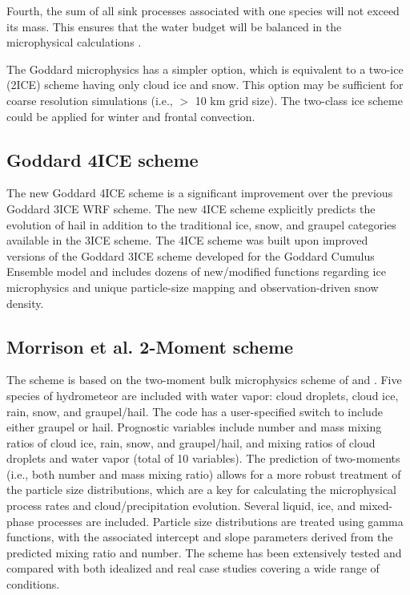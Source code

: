 Fourth, the sum of all sink processes associated with one species will not exceed its mass.  This ensures that the water budget will be balanced in the microphysical calculations .

The Goddard microphysics has a simpler option, which is equivalent to a two-ice (2ICE) scheme having only cloud ice and snow.  This option may be sufficient for coarse resolution simulations (i.e., $>$ 10 km grid size).  The two-class ice scheme could be applied for winter and frontal convection.

\subsection {Goddard 4ICE  scheme}

The new Goddard 4ICE scheme \citep{lang14, tao16} is a significant improvement over the previous Goddard 3ICE WRF scheme.  The new 4ICE scheme explicitly predicts the evolution of hail in addition to the traditional ice, snow, and graupel categories available in the 3ICE scheme.  The 4ICE scheme was built upon improved versions of the Goddard 3ICE scheme developed for the Goddard Cumulus Ensemble model and includes dozens of new/modified functions regarding ice microphysics and unique particle-size mapping and observation-driven snow density.

\subsection {Morrison et al. 2-Moment scheme}

The \citet{morrison08} scheme is based on the two-moment bulk
microphysics scheme of \citet{morrison05} and \citet{morrison06}. Five species of
hydrometeor are included with water vapor: cloud droplets, cloud ice, rain, snow, and
graupel/hail. The code has a user-specified switch to include either graupel or hail. 
Prognostic variables include number and mass mixing ratios
of cloud ice, rain, snow, and graupel/hail, and mixing ratios of cloud
droplets and water vapor (total of 10 variables). The prediction of two-moments (i.e., both number and mass
mixing ratio) allows for a more robust treatment of the particle size
distributions, which are a key for calculating the microphysical process rates
and cloud/precipitation evolution. Several liquid, ice, and mixed-phase
processes are included. Particle size distributions are treated using gamma
functions, with the associated intercept and slope parameters derived from the
predicted mixing ratio and number.
The scheme has been extensively tested and compared with both
idealized and real case studies covering a wide range of conditions.


